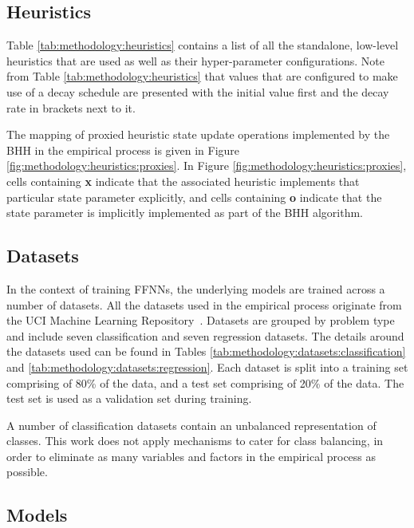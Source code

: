 \subsection{Heuristics}\label{sec:methodology:heuristics}

Table \ref{tab:methodology:heuristics} contains a list of all the standalone, low-level heuristics that are used as well as their hyper-parameter configurations. Note from Table \ref{tab:methodology:heuristics} that values that are configured to make use of a decay schedule are presented with the initial value first and the decay rate in brackets next to it.

The mapping of proxied heuristic state update operations implemented by the \acs{BHH} in the empirical process is given in Figure \ref{fig:methodology:heuristics:proxies}. In Figure \ref{fig:methodology:heuristics:proxies}, cells containing \textbf{x} indicate that the associated heuristic implements that particular state parameter explicitly, and cells containing \textbf{o} indicate that the state parameter is implicitly implemented as part of the \acs{BHH} algorithm.

\subsection{Datasets}\label{sec:methodology:datasets}

In the context of training \acp{FFNN}, the underlying models are trained across a number of datasets. All the datasets used in the empirical process originate from the UCI Machine Learning Repository~\cite{ref:uci:2022}. Datasets are grouped by problem type and include seven classification and seven regression datasets. The details around the datasets used can be found in Tables \ref{tab:methodology:datasets:classification} and \ref{tab:methodology:datasets:regression}. Each dataset is split into a training set comprising of 80\% of the data, and a test set comprising of 20\% of the data. The test set is used as a validation set during training.

A number of classification datasets contain an unbalanced representation of classes. This work does not apply mechanisms to cater for class balancing, in order to eliminate as many variables and factors in the empirical process as possible.

\subsection{Models}\label{sec:methodology:model}

